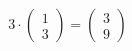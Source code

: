 \documentclass[preview]{standalone}
\begin{document}
\begin{align*}
3 \cdot \begin{pmatrix}1 \\ 3\end{pmatrix} = \begin{pmatrix}3 \\ 9\end{pmatrix}
\end{align*}
\end{document}
